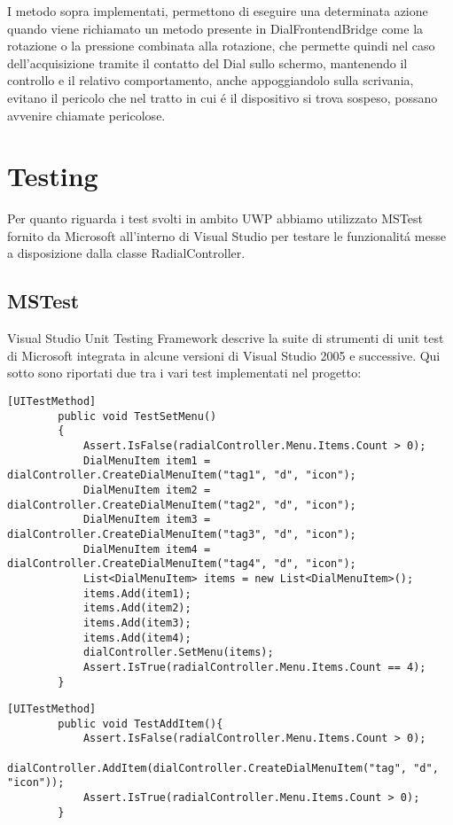 I metodo sopra implementati, permettono di eseguire una determinata azione quando viene richiamato un metodo presente in DialFrontendBridge come la rotazione o la pressione combinata alla rotazione, che permette quindi nel caso dell'acquisizione tramite il contatto del Dial sullo schermo, mantenendo il controllo e il relativo comportamento, anche appoggiandolo sulla scrivania, evitano il pericolo che nel tratto in cui é il dispositivo si trova sospeso, possano avvenire chiamate pericolose.

\section{Testing}

Per quanto riguarda i test svolti in ambito UWP abbiamo utilizzato MSTest fornito da Microsoft all’interno di Visual Studio per testare le funzionalitá messe a disposizione dalla classe RadialController.

\subsection{MSTest}
Visual Studio Unit Testing Framework descrive la suite di strumenti di unit test di Microsoft integrata in alcune versioni di Visual Studio 2005 e successive.
Qui sotto sono riportati due tra i vari test implementati nel progetto:
 
\vspace{1.0cm}
\begin{lstlisting}[caption={Test SetMenu},style=javaScriptCode]
    [UITestMethod]
        public void TestSetMenu()
        {
            Assert.IsFalse(radialController.Menu.Items.Count > 0);
            DialMenuItem item1 = dialController.CreateDialMenuItem("tag1", "d", "icon");
            DialMenuItem item2 = dialController.CreateDialMenuItem("tag2", "d", "icon");
            DialMenuItem item3 = dialController.CreateDialMenuItem("tag3", "d", "icon");
            DialMenuItem item4 = dialController.CreateDialMenuItem("tag4", "d", "icon");
            List<DialMenuItem> items = new List<DialMenuItem>();
            items.Add(item1);
            items.Add(item2);
            items.Add(item3);
            items.Add(item4);
            dialController.SetMenu(items);
            Assert.IsTrue(radialController.Menu.Items.Count == 4);
        }
\end{lstlisting} 
\vspace{1.0cm}

\vspace{1.0cm}
\begin{lstlisting}[caption={Test aggiunta voce di Menu'},style=javaScriptCode]
  [UITestMethod]
        public void TestAddItem(){
            Assert.IsFalse(radialController.Menu.Items.Count > 0);
            dialController.AddItem(dialController.CreateDialMenuItem("tag", "d", "icon"));
            Assert.IsTrue(radialController.Menu.Items.Count > 0);
        }
\end{lstlisting} 
\vspace{1.0cm}
